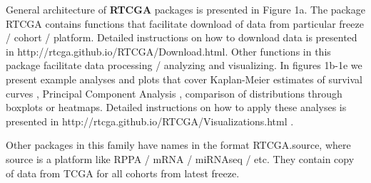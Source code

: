 \documentclass{bioinfo}
\begin{document}
General architecture of \textbf{RTCGA} packages is presented in Figure 1a. The package RTCGA contains functions that facilitate download of data from particular freeze / cohort / platform. Detailed instructions on how to download data is presented in http://rtcga.github.io/RTCGA/Download.html. Other functions in this package facilitate data processing / analyzing and visualizing. In figures 1b-1e we present example analyses and plots that cover Kaplan-Meier estimates of survival curves \citep{kaplanmeier}, Principal Component Analysis \citep{krzanowski2000principles}, comparison of distributions through boxplots or heatmaps. Detailed instructions on how to apply these analyses is presented in http://rtcga.github.io/RTCGA/Visualizations.html .

Other packages in this family have names in the format RTCGA.source, where source is a platform like RPPA / mRNA / miRNAseq / etc. They contain copy of data from TCGA for all cohorts from latest freeze.   
\end{document}
